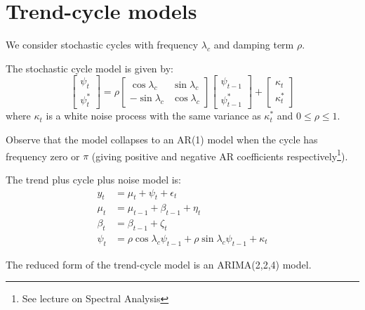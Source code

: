 \documentclass[DIV=14,titlepage=false]{scrreprt}
\begin{document}
\section{Trend-cycle models}
We consider stochastic cycles with frequency $\lambda_c$ and damping term $\rho$. 
\begin{definition}
The stochastic cycle model is given by:
\begin{equation} 
\label{eq:stochseasonal}   
  \begin{bmatrix}
    \psi_t\\
    \psi_{t}^*
  \end{bmatrix}  = \rho \begin{bmatrix}
    \cos \lambda_c & \sin \lambda_c\\
    -\sin \lambda_c & \cos \lambda_c
    \end{bmatrix} \begin{bmatrix}
    \psi_{t-1}\\
    \psi_{t-1}^*
    \end{bmatrix} + \begin{bmatrix}
    \kappa_t\\
    \kappa_t^*
    \end{bmatrix}
\end{equation}
where $\kappa_t$ is a white noise process with the same variance as $\kappa_t^*$ and $0\leq \rho \leq 1$.
\end{definition}
Observe that the model collapses to an AR(1) model when the cycle has frequency zero or $\pi$ (giving positive and negative AR coefficients respectively\footnote{See lecture on Spectral Analysis}).
\begin{definition}
    The trend plus cycle plus noise model is:
    \begin{align*}
        y_t &= \mu_t + \psi_t + \epsilon_t\\
        \mu_t &= \mu_{t-1} + \beta_{t-1} + \eta_t\\
        \beta_t &= \beta_{t-1} + \zeta_t\\
        \psi_t &= \rho \cos \lambda_c \psi_{t-1} + \rho \sin \lambda_c \psi_{t-1} + \kappa_t
    \end{align*}
\end{definition}
\begin{claim}
    The reduced form of the trend-cycle model is an ARIMA(2,2,4) model.
\end{claim}
\end{document}
